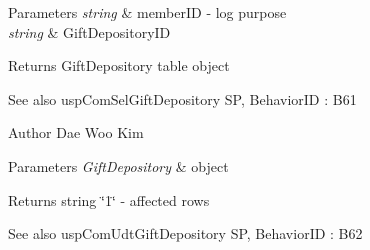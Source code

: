 \begin{DoxyParams}{Parameters}
{\em string} & member\+ID -\/ log purpose \\
\hline
{\em string} & Gift\+Depository\+ID \\
\hline
\end{DoxyParams}
\begin{DoxyReturn}{Returns}
Gift\+Depository table object 
\end{DoxyReturn}
\begin{DoxySeeAlso}{See also}
usp\+Com\+Sel\+Gift\+Depository SP, Behavior\+ID \+: B61
\end{DoxySeeAlso}
\begin{DoxyAuthor}{Author}
Dae Woo Kim 
\end{DoxyAuthor}

\begin{DoxyParams}{Parameters}
{\em Gift\+Depository} & object \\
\hline
\end{DoxyParams}
\begin{DoxyReturn}{Returns}
string \char`\"{}1\char`\"{} -\/ affected rows 
\end{DoxyReturn}
\begin{DoxySeeAlso}{See also}
usp\+Com\+Udt\+Gift\+Depository SP, Behavior\+ID \+: B62 
\end{DoxySeeAlso}
